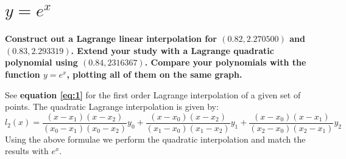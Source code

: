 \documentclass[12,a4paper]{article}
\begin{document}
    \section{$y = e^x$}
    \textbf{Construct out a Lagrange linear interpolation for $(0.82, 2.270500)$ and $(0.83, 2.293319)$. Extend your study with a Lagrange quadratic polynomial using $(0.84, 2316367)$. Compare your polynomials with the function $y = e^x$, plotting all of them on the same graph.}
    
    See \textbf{equation \ref{eq:1}} for the first order Lagrange interpolation of a given set of points. The quadratic Lagrange interpolation is given by:
    \begin{equation}
        \nonumber
        \label{eq:2}
        l_2(x) = \frac{(x - x_1)(x - x_2)}{(x_0 - x_1)(x_0 - x_2)}y_0 + \frac{(x - x_0)(x - x_2)}{(x_1 - x_0)(x_1 - x_2)}y_1 + \frac{(x - x_0)(x - x_1)}{(x_2 - x_0)(x_2 - x_1)}y_2
    \end{equation}
    Using the above formulae we perform the quadratic interpolation and match the results with $e^x$.
\end{document}
